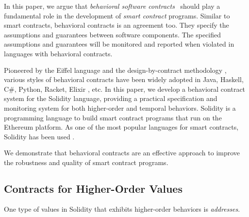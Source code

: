 In this paper, we argue that \emph{behavioral software
contracts}~\cite{DBLP:conf/tools/Meyer98a} should play a fundamental role in
the
development of \emph{smart contract} programs.  Similar to smart contracts,
behavioral contracts is an agreement too. They specify the assumptions and
guarantees between software components. The specified assumptions and
guarantees will be monitored and reported when violated in languages with
behavioral contracts.

Pioneered by the Eiffel language \cite{DBLP:books/ph/Meyer91} and the
design-by-contract methodology \cite{DBLP:conf/tools/Meyer98a}, various styles
of behavioral contracts have been widely adopted in Java, Haskell, C\#, Python,
Racket, Elixir \cite{DBLP:conf/erlang/0001BBHMEF22}, etc. 
In this paper, we develop a behavioral contract system \lang for the Solidity
language, providing a practical specification and monitoring system
for both higher-order and temporal behaviors.
Solidity is a programming language to build smart contract programs that run on
the Ethereum platform.  As one of the most popular languages for smart
contracts, Solidity has been used .

We demonstrate that behavioral contracts are an effective approach
to improve the robustness and quality of smart contract programs.




\subsection*{\textbf{Contracts for Higher-Order Values}}

One type of values in Solidity that exhibits higher-order behaviors is \emph{addresses}.

